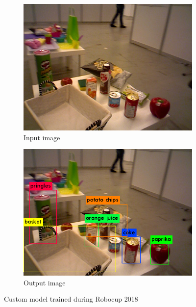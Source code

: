 \documentclass[runningheads,a4paper]{llncs}
\begin{document}
\begin{figure}[h!]
  \centering
  \begin{subfigure}[b]{0.43\linewidth}
    \includegraphics[width=\linewidth]{images/input_objects.JPEG}
    \caption{Input image}
  \end{subfigure}
  \hspace{1.5cm}
  \begin{subfigure}[b]{0.43\linewidth}
    \includegraphics[width=\linewidth]{images/output_objects.png}
    \caption{Output image}
  \end{subfigure}
  \caption{Custom model trained during Robocup 2018}
  \label{fig:coffee}
\end{figure} 
\end{document}
